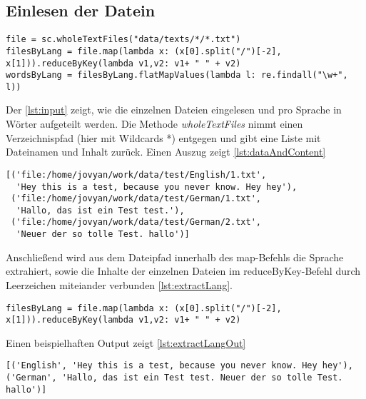 \documentclass[chapterprefix=true, 12pt, a4paper, oneside, parskip=half, listof=totoc, bibliography=totoc, numbers=noendperiod]{scrbook}
\begin{document}
\subsection{Einlesen der Datein}

\begin{lstlisting}[caption={Daten einlesen}, captionpos=b, label={lst:input}]
file = sc.wholeTextFiles("data/texts/*/*.txt")
filesByLang = file.map(lambda x: (x[0].split("/")[-2], x[1])).reduceByKey(lambda v1,v2: v1+ " " + v2)
wordsByLang = filesByLang.flatMapValues(lambda l: re.findall("\w+", l))
\end{lstlisting}

Der \autoref{lst:input} zeigt, wie die einzelnen Dateien eingelesen und pro Sprache in Wörter aufgeteilt werden. 
Die Methode  \textit{wholeTextFiles} nimmt einen Verzeichnispfad (hier mit Wildcards *) entgegen und gibt eine Liste mit Dateinamen und Inhalt zurück. Einen Auszug zeigt \autoref{lst:dataAndContent}


\begin{lstlisting}[caption={Gelesene Pfade und Inhalt}, captionpos=b, label={lst:dataAndContent}]
[('file:/home/jovyan/work/data/test/English/1.txt',
  'Hey this is a test, because you never know. Hey hey'),
 ('file:/home/jovyan/work/data/test/German/1.txt',
  'Hallo, das ist ein Test test.'),
 ('file:/home/jovyan/work/data/test/German/2.txt',
  'Neuer der so tolle Test. hallo')]
\end{lstlisting}
Anschließend wird aus dem Dateipfad innerhalb des map-Befehls die Sprache extrahiert, sowie die Inhalte der einzelnen Dateien im reduceByKey-Befehl durch Leerzeichen miteiander verbunden \autoref{lst:extractLang}.

\begin{lstlisting}[caption={Sprache extrahieren und Dateien zusammenfügen}, captionpos=b, label={lst:extractLang}]
filesByLang = file.map(lambda x: (x[0].split("/")[-2], x[1])).reduceByKey(lambda v1,v2: v1+ " " + v2)
\end{lstlisting}

 Einen beispielhaften Output zeigt \autoref{lst:extractLangOut} 
 
 
 \begin{lstlisting}[caption={Sprache extrahieren und Dateien zusammenfügen Output}, captionpos=b, label={lst:extractLangOut}]
[('English', 'Hey this is a test, because you never know. Hey hey'),
('German', 'Hallo, das ist ein Test test. Neuer der so tolle Test. hallo')]
\end{lstlisting}
 
\end{document}
